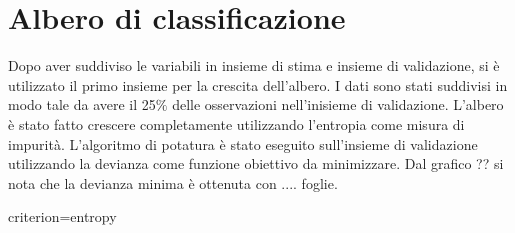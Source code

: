 \documentclass[./main.tex]{subfiles}
\begin{document}
\section{Albero di classificazione}
Dopo aver suddiviso le variabili in insieme di stima e insieme di validazione, si è utilizzato il primo insieme per la crescita dell'albero. I dati sono stati suddivisi in modo tale da avere il 25$\%$ delle osservazioni nell'inisieme di validazione.
L'albero è stato fatto crescere completamente utilizzando l'entropia come misura di impurità. L'algoritmo di potatura è stato eseguito sull'insieme di validazione utilizzando la devianza come funzione obiettivo da minimizzare. Dal grafico ?? si nota che la devianza minima è ottenuta con .... foglie.

criterion=entropy
\end{document}
